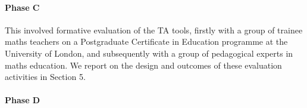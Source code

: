 \paragraph{Phase C}
\label{sec:phase-c}

This involved formative evaluation of the TA tools, 
firstly with a group of trainee
maths teachers on a Postgraduate Certificate in Education programme
at the University of London, and subsequently with a group of pedagogical 
experts in maths education. We report on the design and outcomes of these 
evaluation activities in Section 5.

\paragraph{Phase D}
\label{sec:phase-d}
 
